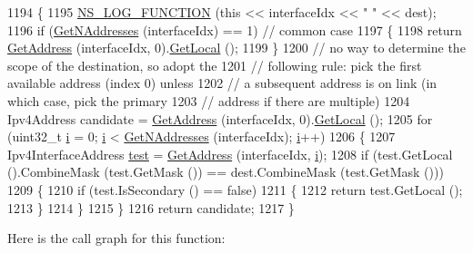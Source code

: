 \begin{DoxyCode}
1194 \{
1195   \hyperlink{log-macros-disabled_8h_a90b90d5bad1f39cb1b64923ea94c0761}{NS\_LOG\_FUNCTION} (\textcolor{keyword}{this} << interfaceIdx << \textcolor{stringliteral}{" "} << dest);
1196   \textcolor{keywordflow}{if} (\hyperlink{classns3_1_1Ipv4L3Protocol_ab816ec1b5f680117bc1363b3d9649b22}{GetNAddresses} (interfaceIdx) == 1)  \textcolor{comment}{// common case}
1197     \{
1198       \textcolor{keywordflow}{return} \hyperlink{classns3_1_1Ipv4L3Protocol_a85fa4287313a773dee29aa73fa74a7e0}{GetAddress} (interfaceIdx, 0).\hyperlink{classns3_1_1Ipv4InterfaceAddress_a716a425049f48b9fe6e38868b1f413f6}{GetLocal} ();
1199     \}
1200   \textcolor{comment}{// no way to determine the scope of the destination, so adopt the}
1201   \textcolor{comment}{// following rule:  pick the first available address (index 0) unless}
1202   \textcolor{comment}{// a subsequent address is on link (in which case, pick the primary}
1203   \textcolor{comment}{// address if there are multiple)}
1204   Ipv4Address candidate = \hyperlink{classns3_1_1Ipv4L3Protocol_a85fa4287313a773dee29aa73fa74a7e0}{GetAddress} (interfaceIdx, 0).\hyperlink{classns3_1_1Ipv4InterfaceAddress_a716a425049f48b9fe6e38868b1f413f6}{GetLocal} ();
1205   \textcolor{keywordflow}{for} (uint32\_t \hyperlink{bernuolliDistribution_8m_a6f6ccfcf58b31cb6412107d9d5281426}{i} = 0; \hyperlink{bernuolliDistribution_8m_a6f6ccfcf58b31cb6412107d9d5281426}{i} < \hyperlink{classns3_1_1Ipv4L3Protocol_ab816ec1b5f680117bc1363b3d9649b22}{GetNAddresses} (interfaceIdx); \hyperlink{bernuolliDistribution_8m_a6f6ccfcf58b31cb6412107d9d5281426}{i}++)
1206     \{
1207       Ipv4InterfaceAddress \hyperlink{main-test-sync_8cc_a708a4c1a4d0c4acc4c447310dd4db27f}{test} = \hyperlink{classns3_1_1Ipv4L3Protocol_a85fa4287313a773dee29aa73fa74a7e0}{GetAddress} (interfaceIdx, \hyperlink{bernuolliDistribution_8m_a6f6ccfcf58b31cb6412107d9d5281426}{i});
1208       \textcolor{keywordflow}{if} (test.GetLocal ().CombineMask (test.GetMask ()) == dest.CombineMask (test.GetMask ()))
1209         \{
1210           \textcolor{keywordflow}{if} (test.IsSecondary () == \textcolor{keyword}{false})
1211             \{
1212               \textcolor{keywordflow}{return} test.GetLocal ();
1213             \}
1214         \}
1215     \}
1216   \textcolor{keywordflow}{return} candidate;
1217 \}
\end{DoxyCode}


Here is the call graph for this function\+:




